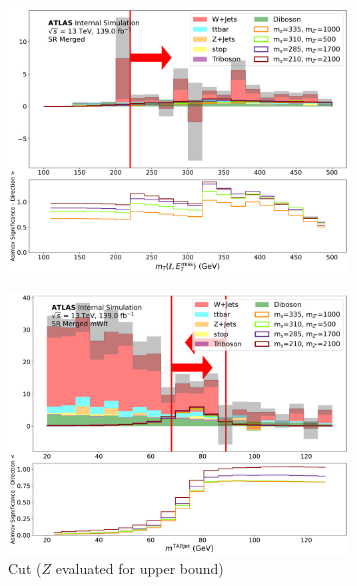 \begin{figure}[htbp]
  \centering
    \begin{subfigure}[t]{0.48\textwidth}
    \centering
     \includegraphics[width = 0.99\textwidth]{Figures/5/SR1L_Merged/mT_lep_met_N_1.pdf}
    \caption{\mtlepmet}
    \end{subfigure}
    \begin{subfigure}[t]{0.48\textwidth}
    \centering
     \includegraphics[width = 0.99\textwidth]{Figures/5/SR1L_Merged_mWlt/TARJets10_mTAR0_N_1.pdf}
     \caption{\mTAR Cut (\(Z\) evaluated for upper bound)}
    \end{subfigure}
    \begin{subfigure}[t]{0.48\textwidth}

\end{subfigure}
\end{figure}
